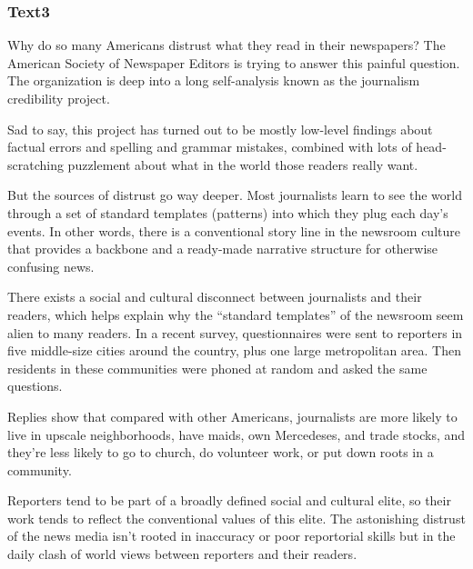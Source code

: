 \documentclass[a4paper]{article}
\begin{document}
\subsubsection{Text3}

\par
Why do so many Americans distrust what they read in their newspapers? The American Society of Newspaper Editors is trying to answer this painful question. The organization is deep into a long self-analysis known as the journalism credibility project.

\par
Sad to say, this project has turned out to be mostly low-level findings about factual errors and spelling and grammar mistakes, combined with lots of head-scratching puzzlement about what in the world those readers really want.

\par
But the sources of distrust go way deeper. Most journalists learn to see the world through a set of standard templates (patterns) into which they plug each day’s events. In other words, there is a conventional story line in the newsroom culture that provides a backbone and a ready-made narrative structure for otherwise confusing news.

\par
There exists a social and cultural disconnect between journalists and their readers, which helps explain why the “standard templates” of the newsroom seem alien to many readers. In a recent survey, questionnaires were sent to reporters in five middle-size cities around the country, plus one large metropolitan area. Then residents in these communities were phoned at random and asked the same questions.

\par
Replies show that compared with other Americans, journalists are more likely to live in upscale neighborhoods, have maids, own Mercedeses, and trade stocks, and they’re less likely to go to church, do volunteer work, or put down roots in a community.

\par
Reporters tend to be part of a broadly defined social and cultural elite, so their work tends to reflect the conventional values of this elite. The astonishing distrust of the news media isn’t rooted in inaccuracy or poor reportorial skills but in the daily clash of world views between reporters and their readers.
\end{document}

